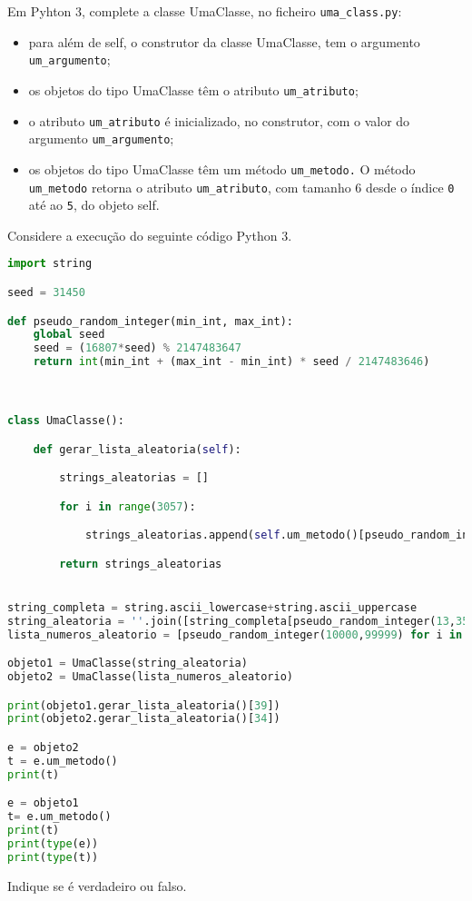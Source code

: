\documentclass[12pt,varwidth=16cm,border=17pt]{standalone}
\begin{document}
Em Pyhton 3, complete a classe UmaClasse, no ficheiro \verb+uma_class.py+:

\begin{itemize}
  \item para além de self, o construtor da classe UmaClasse, tem o argumento \verb+um_argumento+;
  \item os objetos do tipo UmaClasse têm o atributo \verb+um_atributo+;
  \item o atributo \verb+um_atributo+ é inicializado, no construtor, com o valor
do argumento \verb+um_argumento+;
  \item os objetos do tipo UmaClasse têm um método \verb+um_metodo.+ O
    método \verb+um_metodo+ retorna o atributo \verb+um_atributo+, com tamanho 6 desde o índice \verb+0+ até ao \verb+5+, do objeto self.
\end{itemize}

Considere a execução do seguinte código Python 3.



\begin{lstlisting}[language=Python]
import string

seed = 31450

def pseudo_random_integer(min_int, max_int):
    global seed
    seed = (16807*seed) % 2147483647
    return int(min_int + (max_int - min_int) * seed / 2147483646)



class UmaClasse():

	def gerar_lista_aleatoria(self):

		strings_aleatorias = []

		for i in range(3057):

			strings_aleatorias.append(self.um_metodo()[pseudo_random_integer(0, 5)])

		return strings_aleatorias


string_completa = string.ascii_lowercase+string.ascii_uppercase
string_aleatoria = ''.join([string_completa[pseudo_random_integer(13,35)] for i in range(3057)])
lista_numeros_aleatorio = [pseudo_random_integer(10000,99999) for i in range(3057)]

objeto1 = UmaClasse(string_aleatoria)
objeto2 = UmaClasse(lista_numeros_aleatorio)

print(objeto1.gerar_lista_aleatoria()[39])
print(objeto2.gerar_lista_aleatoria()[34])

e = objeto2
t = e.um_metodo()
print(t)

e = objeto1
t= e.um_metodo()
print(t)
print(type(e))
print(type(t))
\end{lstlisting}

Indique se é verdadeiro ou falso.
\end{document}
